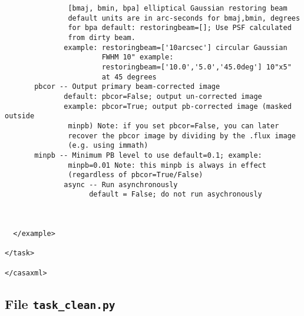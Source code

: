 \begin{verbatim}
               [bmaj, bmin, bpa] elliptical Gaussian restoring beam
               default units are in arc-seconds for bmaj,bmin, degrees
               for bpa default: restoringbeam=[]; Use PSF calculated
               from dirty beam. 
              example: restoringbeam=['10arcsec'] circular Gaussian 
                       FWHM 10" example:
                       restoringbeam=['10.0','5.0','45.0deg'] 10"x5" 
                       at 45 degrees
       pbcor -- Output primary beam-corrected image 
              default: pbcor=False; output un-corrected image 
              example: pbcor=True; output pb-corrected image (masked outside
               minpb) Note: if you set pbcor=False, you can later
               recover the pbcor image by dividing by the .flux image
               (e.g. using immath)
       minpb -- Minimum PB level to use default=0.1; example:
               minpb=0.01 Note: this minpb is always in effect
               (regardless of pbcor=True/False) 
              async -- Run asynchronously 
                    default = False; do not run asychronously



  </example>

</task>

</casaxml>
\end{verbatim}


\subsection{File {\tt task\_clean.py} }
\label{section:write.clean.py}

